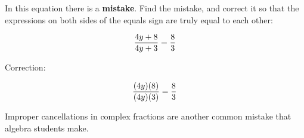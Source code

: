 

In this equation there is a {\bf mistake}.  Find the mistake, and correct it so that the expressions on both sides of the equals sign are truly equal to each other:

$${{4y + 8} \over {4y + 3}} = {8 \over 3}$$







Correction:

$${{(4y)(8)} \over {(4y)(3)}} = {8 \over 3}$$







Improper cancellations in complex fractions are another common mistake that algebra students make.




